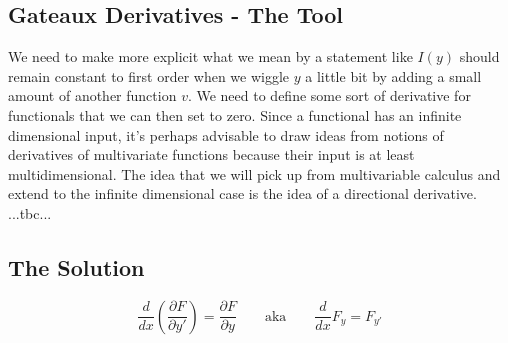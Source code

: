 \subsection{Gateaux Derivatives - The Tool}
We need to make more explicit what we mean by a statement like $I(y)$ should remain constant to first order when we wiggle $y$ a little bit by adding a small amount of another function $v$. We need to define some sort of derivative for functionals that we can then set to zero. Since a functional has an infinite dimensional input, it's perhaps advisable to draw ideas from notions of derivatives of multivariate functions because their input is at least multidimensional. The idea that we will pick up from multivariable calculus and extend to the infinite dimensional case is the idea of a directional derivative. ...tbc...












\subsection{The Solution}




\begin{equation}
 \frac{d}{d x} \left(  \frac{\partial F}{\partial y'}  \right) = \frac{\partial F}{\partial y}
 \qquad \text{aka} \qquad
 \frac{d}{d x} F_y = F_{y'}
\end{equation}


